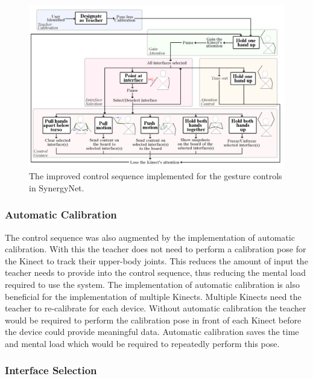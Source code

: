 \documentclass[link]{IWCOMP}
\begin{document}
\begin{figure}[t]
  \centering
  \includegraphics[width=1\textwidth]{figures/control_sequence_flow_diagram.png}
  \caption{The improved control sequence implemented for the gesture controls in SynergyNet.}
  \label{fig:controlSequenceFlowDiagram}
\end{figure}

\subsubsection{Automatic Calibration}  
\label{subsubsec:studyImplementationAutoCalibration}

The control sequence was also augmented by the implementation of automatic calibration.
With this the teacher does not need to perform a calibration pose for the Kinect to track their upper-body joints.
This reduces the amount of input the teacher needs to provide into the control sequence, thus reducing the mental load required to use the system.
The implementation of automatic calibration is also beneficial for the implementation of multiple Kinects.
Multiple Kinects need the teacher to re-calibrate for each device.
Without automatic calibration the teacher would be required to perform the calibration pose in front of each Kinect before the device could provide meaningful data.
Automatic calibration saves the time and mental load which would be required to repeatedly perform this pose.

\subsubsection{Interface Selection}  
\label{subsubsec:studyImplementationInterfaceSelection}
\end{document}
